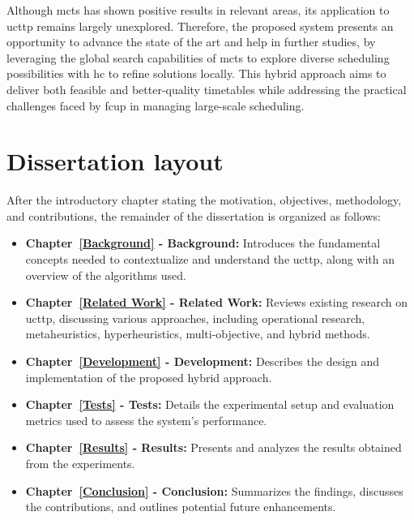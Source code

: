 Although \ac{mcts} has shown positive results in relevant areas, its application to \ac{ucttp} remains largely unexplored. Therefore, the proposed system presents an opportunity to advance the state of the art and help in further studies, by leveraging the global search capabilities of \ac{mcts} to explore diverse scheduling possibilities with \ac{hc} to refine solutions locally. This hybrid approach aims to deliver both feasible and better-quality timetables while addressing the practical challenges faced by \ac{fcup} in managing large-scale scheduling.

\section{Dissertation layout}

After the introductory chapter stating the motivation, objectives, methodology, and contributions, the remainder of the dissertation is organized as follows:

\begin{itemize}
\item \textbf{Chapter~\ref{Background} - Background:} Introduces the fundamental concepts needed to contextualize and understand the \ac{ucttp}, along with an overview of the algorithms used.
\item \textbf{Chapter~\ref{Related Work} -  Related Work:} Reviews existing research on \ac{ucttp}, discussing various approaches, including operational research, metaheuristics, hyperheuristics, multi-objective, and hybrid methods.
\item \textbf{Chapter~\ref{Development} -  Development:} Describes the design and implementation of the proposed hybrid approach.
\item \textbf{Chapter~\ref{Tests} - Tests:} Details the experimental setup and evaluation metrics used to assess the system's performance.
\item \textbf{Chapter~\ref{Results} -  Results:} Presents and analyzes the results obtained from the experiments. 
\item \textbf{Chapter~\ref{Conclusion} - Conclusion:} Summarizes the findings, discusses the contributions, and outlines potential future enhancements.
\end{itemize}



